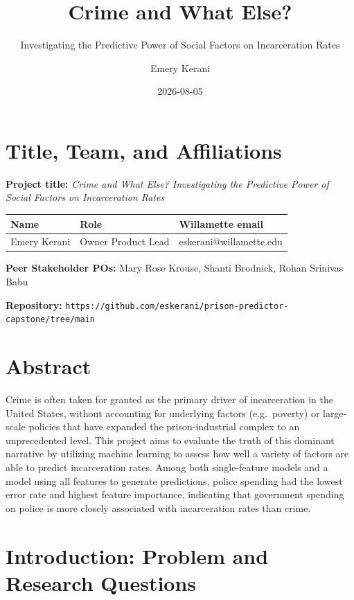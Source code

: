 \documentclass[
  letterpaper,
  DIV=11,
  numbers=noendperiod]{scrartcl}
\title{Crime and What Else?}
\subtitle{Investigating the Predictive Power of Social Factors on
Incarceration Rates}
\author{Emery Kerani}
\date{2026-08-05}
\renewcommand*\contentsname{Table of contents}
\newcommand\contentsname{Table of contents}
\begin{document}
\maketitle

\renewcommand*\contentsname{Table of contents}
{
\hypersetup{linkcolor=}
\setcounter{tocdepth}{3}
\tableofcontents
}

\section{Title, Team, and
Affiliations}\label{title-team-and-affiliations}

\textbf{Project title:} \emph{Crime and What Else? Investigating the
Predictive Power of Social Factors on Incarceration Rates}

\begin{longtable}[]{@{}lll@{}}
\toprule\noalign{}
Name & Role & Willamette email \\
\midrule\noalign{}
\endhead
\bottomrule\noalign{}
\endlastfoot
Emery Kerani & Owner Product Lead & eskerani@willamette.edu \\
\end{longtable}

\textbf{Peer Stakeholder POs:} Mary Rose Krouse, Shanti Brodnick, Rohan
Srinivas Babu

\textbf{Repository:}
\texttt{https://github.com/eskerani/prison-predictor-capstone/tree/main}

\section{Abstract}\label{abstract}

Crime is often taken for granted as the primary driver of incarceration
in the United States, without accounting for underlying factors
(e.g.~poverty) or large-scale policies that have expanded the
prison-industrial complex to an unprecedented level. This project aims
to evaluate the truth of this dominant narrative by utilizing machine
learning to assess how well a variety of factors are able to predict
incarceration rates. Among both single-feature models and a model using
all features to generate predictions, police spending had the lowest
error rate and highest feature importance, indicating that government
spending on police is more closely associated with incarceration rates
than crime.

\section{Introduction: Problem and Research
Questions}\label{introduction-problem-and-research-questions}
\end{document}
